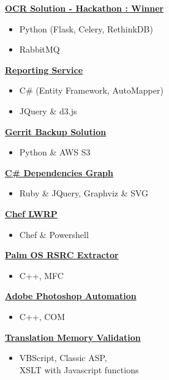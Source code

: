 {\textbf{\href{http://johnpaulnewman.com/projects/papers-ocr-solution/}{OCR Solution - Hackathon : Winner}}
\begin{itemize}[noitemsep,topsep=-5pt]
  \item Python (Flask, Celery, RethinkDB)
  \item RabbitMQ \\
\end{itemize}
\textbf{\href{http://johnpaulnewman.com/projects/reporting-service/}{Reporting Service}}
\begin{itemize}[noitemsep,topsep=-5pt]
  \item C\# (Entity Framework, AutoMapper)
  \item JQuery \& d3.js \\
\end{itemize}
\textbf{\href{http://johnpaulnewman.com/projects/gerrit-backup-solution/}{Gerrit Backup Solution}}
\begin{itemize}[noitemsep,topsep=-5pt]
  \item Python \& AWS S3 \\
\end{itemize}
\textbf{\href{http://johnpaulnewman.com/projects/csharp-dependencies-graph/}{C\# Dependencies Graph}}
\begin{itemize}[noitemsep,topsep=-5pt]
  \item Ruby \& JQuery, Graphviz \& SVG \\
\end{itemize}
\textbf{\href{http://johnpaulnewman.com/projects/chef-lwrp/}{Chef LWRP}}
\begin{itemize}[noitemsep,topsep=-5pt]
  \item Chef \& Powershell \\
\end{itemize}
\textbf{\href{http://johnpaulnewman.com/projects/palm-os-rsrc-extractor/}{Palm OS RSRC Extractor}}
\begin{itemize}[noitemsep,topsep=-5pt]
  \item C++, MFC \\
\end{itemize}
\textbf{\href{http://johnpaulnewman.com/projects/adobe-photoshop-automation/}{Adobe Photoshop Automation}}
\begin{itemize}[noitemsep,topsep=-5pt]
  \item C++, COM \\
\end{itemize}
\textbf{\href{http://johnpaulnewman.com/projects/translation-memory-validation/}{Translation Memory Validation}}
\begin{itemize}[noitemsep,topsep=-5pt]
  \item VBScript, Classic ASP, \\XSLT with Javascript functions \\
\end{itemize}
}
